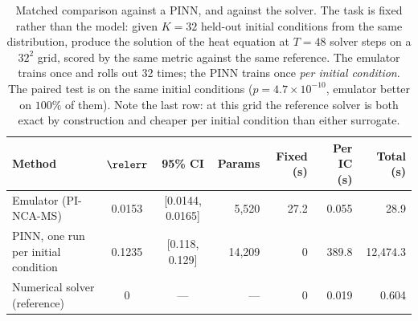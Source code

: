 \begin{table}[t]
\centering
\caption{Matched comparison against a PINN, and against the solver. The task is fixed
rather than the model: given $K=32$ held-out initial conditions from the same
distribution, produce the solution of the heat equation at $T=48$ solver steps on a
$32^2$ grid, scored by the same metric against the same reference. The emulator trains
once and rolls out 32 times; the PINN trains once \emph{per initial condition}. The
paired test is on the same initial conditions ($p=4.7\times10^{-10}$, emulator better on
$100\%$ of them). Note the last row: at this grid the reference solver is both exact by
construction and cheaper per initial condition than either surrogate.}
\label{tab:matched}
\small
\begin{tabular}{lccrrrr}
\toprule
Method & $\relerr$ & 95\% CI & Params & Fixed (s) & Per IC (s) & Total (s) \\
\midrule
Emulator (PI-NCA-MS) & 0.0153 & [0.0144, 0.0165] & 5{,}520 & 27.2 & 0.055 & 28.9 \\
PINN, one run per initial condition      & 0.1235 & [0.118, 0.129]   & 14{,}209 & 0 & 389.8 & 12{,}474.3 \\
Numerical solver (reference)             & 0 & --- & --- & 0 & 0.019 & 0.604 \\
\bottomrule
\end{tabular}
\end{table}
